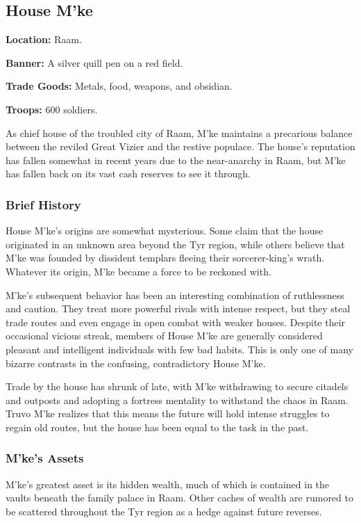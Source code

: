 \subsection{House M'ke}
\textbf{Location:} Raam.

\textbf{Banner:} A silver quill pen on a red field.

\textbf{Trade Goods:} Metals, food, weapons, and obsidian.

\textbf{Troops:} 600 soldiers.

As chief house of the troubled city of Raam, M'ke maintains a precarious balance between the reviled Great Vizier and the restive populace. The house's reputation has fallen somewhat in recent years due to the near-anarchy in Raam, but M'ke has fallen back on its vast cash reserves to see it through.

\subsubsection{Brief History}
House M'ke's origins are somewhat mysterious. Some claim that the house originated in an unknown area beyond the Tyr region, while others believe that M'ke was founded by dissident templars fleeing their sorcerer-king's wrath. Whatever its origin, M'ke became a force to be reckoned with.

M'ke's subsequent behavior has been an interesting combination of ruthlessness and caution. They treat more powerful rivals with intense respect, but they steal trade routes and even engage in open combat with weaker houses. Despite their occasional vicious streak, members of House M'ke are generally considered pleasant and intelligent individuals with few bad habits. This is only one of many bizarre contrasts in the confusing, contradictory House M'ke.

Trade by the house has shrunk of late, with M'ke withdrawing to secure citadels and outposts and adopting a fortress mentality to withstand the chaos in Raam. Truvo M'ke realizes that this means the future will hold intense struggles to regain old routes, but the house has been equal to the task in the past.

\subsubsection{M'ke's Assets}
M'ke's greatest asset is its hidden wealth, much of which is contained in the vaults beneath the family palace in Raam. Other caches of wealth are rumored to be scattered throughout the Tyr region as a hedge against future reverses.


